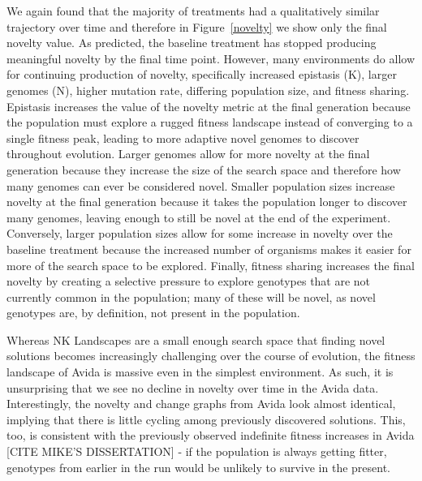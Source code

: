 \documentclass[letterpaper]{article}
\begin{document}
We again found that the majority of treatments had a qualitatively similar trajectory over time and therefore in Figure~\ref{novelty} we show only the final novelty value. As predicted, the baseline treatment has stopped producing meaningful novelty by the final time point. However, many environments do allow for continuing production of novelty, specifically increased epistasis (K), larger genomes (N), higher mutation rate, differing population size, and fitness sharing. Epistasis increases the value of the novelty metric at the final generation because the population must explore a rugged fitness landscape instead of converging to a single fitness peak, leading to more adaptive novel genomes to discover throughout evolution. Larger genomes allow for more novelty at the final generation because they increase the size of the search space and therefore how many genomes can ever be considered novel. Smaller population sizes increase novelty at the final generation because it takes the population longer to discover many genomes, leaving enough to still be novel at the end of the experiment. Conversely, larger population sizes allow for some increase in novelty over the baseline treatment because the increased number of organisms makes it easier for more of the search space to be explored. Finally, fitness sharing increases the final novelty by creating a selective pressure to explore genotypes that are not currently common in the population; many of these will be novel, as novel genotypes are, by definition, not present in the population.

Whereas NK Landscapes are a small enough search space that finding novel solutions becomes increasingly challenging over the course of evolution, the fitness landscape of Avida is massive even in the simplest environment. As such, it is unsurprising that we see no decline in novelty over time in the Avida data. Interestingly, the novelty and change graphs from Avida look almost identical, implying that there is little cycling among previously discovered solutions. This, too, is consistent with the previously observed indefinite fitness increases in Avida [CITE MIKE'S DISSERTATION] - if the population is always getting fitter, genotypes from earlier in the run would be unlikely to survive in the present.
\end{document}
